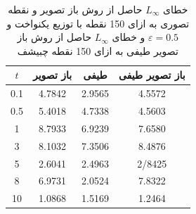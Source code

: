 \begin{table}[htp] 
	\centering\caption{
		خطای
		$L_{\infty}$
		حاصل از روش باز تصویر و نقطه تصوری به ازای 150 نقطه با توزیع یکنواخت و
		$\varepsilon=0.5$
		و خطای 
		$L_{\infty}$
		حاصل از روش باز تصویر طیفی به ازای 150 نقطه چبیشف
	}
	\label{tab:re2}
	\renewcommand*{\arraystretch}{1.2}
	\vspace*{.4cm}
	\begin{tabular}{||c|c|c|c||}%
		\hline
		$t$ & باز تصویر &  طیفی  & باز تصویر طیفی   \\
		\hline
		0.1     & 4.7842   & 2.9565     & 4.5572        \\
		0.5        & 5.4018       & 4.7338    & 4.5603        \\
		1          & 8.7933      &6.9239     & 7.6580        \\
		3          & 8.1032       & 7.3506   & 8.4876       \\
		5          & 2.6041      &2.4963    & 2/8425        \\
		8          &6.9731     & 2.0524     & 7.8322       \\
		10         & 1.0868      & 1.5169     & 1.2464      \\
		\hline
	\end{tabular}
\end{table}
%
%
